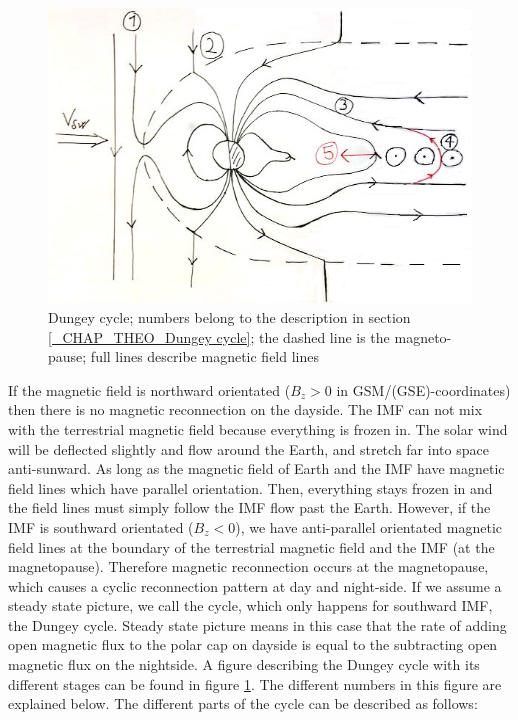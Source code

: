 \documentclass[10pt,a4paper]{article}
\begin{document}
\begin{figure}[h]
\centering
\caption{Dungey cycle; numbers belong to the description in section \ref{_CHAP_THEO_Dungey cycle}; the dashed line is the magneto-pause; full lines describe magnetic field lines}
\label{Dungey cycle}
\includegraphics[scale=0.5]{solvind.jpg}
\end{figure}
If the magnetic field is northward orientated ($B_z>0$ in GSM/(GSE)-coordinates) then there is no magnetic reconnection on the dayside. 
The IMF can not mix with the terrestrial magnetic field because everything is frozen in. The solar wind will be deflected slightly and flow around the Earth, and stretch far into space anti-sunward. As long as the magnetic field of Earth and the IMF have magnetic field lines which have parallel orientation.  
Then, everything stays frozen in and the field lines must simply follow the IMF flow past the Earth. However, if the IMF is southward orientated ($B_z<0$), we have anti-parallel orientated magnetic field lines at the boundary of the terrestrial magnetic field and the IMF (at the magnetopause). Therefore magnetic reconnection occurs at the magnetopause, which causes a cyclic reconnection pattern at day and night-side. If we assume a steady state picture, we call the cycle, which only happens for southward IMF, the Dungey cycle. Steady state picture means in this case that the rate of adding open magnetic flux to the polar cap on dayside is equal to the subtracting open magnetic flux on the nightside. A figure describing the Dungey cycle with its different stages can be found in figure \ref{Dungey cycle}. The different numbers in this figure are explained below. The different parts of the cycle can be described as follows:
\end{document}
